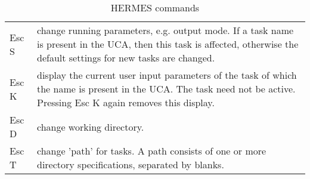 \begin{table}
\begin{center}
\begin{tabular}{ | l@{ - }p{12cm} |}
Esc S& change running parameters, e.g. output mode. If a task name is present
in the UCA, then this task is affected, otherwise the default settings
for new tasks are changed.\\
Esc K& display the current user input parameters of the task of which the name
is present in the UCA. The task need not be active. Pressing Esc K again
removes this display. \\
Esc D& change working directory.\\
Esc T& change 'path' for tasks. A path consists of one or more directory
       specifications, separated by blanks.\\
\hline
\end{tabular}
\caption{HERMES commands}
\label{tab:hermescom1}
\end{center}
\end{table}

